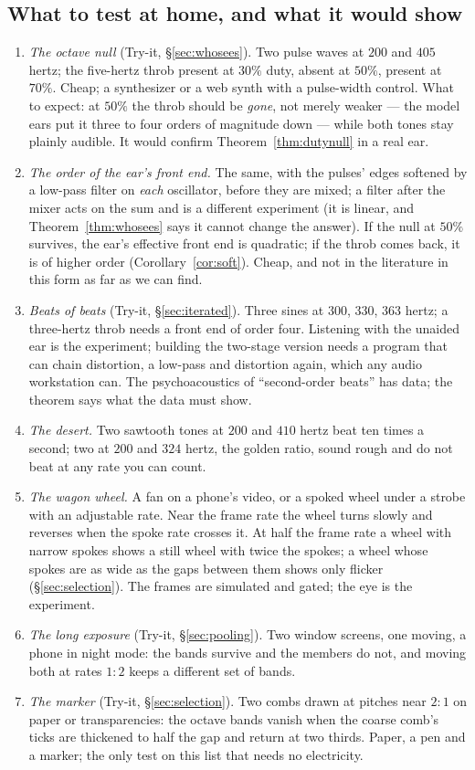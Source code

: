 \subsection{What to test at home, and what it would show}
\begin{enumerate}
\item \emph{The octave null} (Try-it, \S\ref{sec:whosees}). Two pulse
waves at $200$ and $405$ hertz; the five-hertz throb present at $30\%$
duty, absent at $50\%$, present at $70\%$. Cheap; a synthesizer or a web
synth with a pulse-width control. What to expect: at $50\%$ the throb
should be \emph{gone}, not merely weaker --- the model ears put it three to
four orders of magnitude down --- while both tones stay plainly audible.
It would confirm Theorem~\ref{thm:dutynull} in a real ear.
\item \emph{The order of the ear's front end.} The same, with the pulses'
edges softened by a low-pass filter on \emph{each} oscillator, before they
are mixed; a filter after the mixer acts on the sum and is a different
experiment (it is linear, and Theorem~\ref{thm:whosees} says it cannot
change the answer). If the null at $50\%$ survives, the ear's effective
front end is quadratic; if the throb comes back, it is of higher order
(Corollary~\ref{cor:soft}). Cheap, and not in the literature in this form
as far as we can find.
\item \emph{Beats of beats} (Try-it, \S\ref{sec:iterated}). Three sines at
$300$, $330$, $363$ hertz; a three-hertz throb needs a front end of order
four. Listening with the unaided ear is the experiment; building the
two-stage version needs a program that can chain distortion, a low-pass and
distortion again, which any audio workstation can. The psychoacoustics of
``second-order beats'' has data; the theorem says what the data must show.
\item \emph{The desert.} Two sawtooth tones at $200$ and $410$ hertz beat
ten times a second; two at $200$ and $324$ hertz, the golden ratio, sound
rough and do not beat at any rate you can count.
\item \emph{The wagon wheel.} A fan on a phone's video, or a spoked wheel
under a strobe with an adjustable rate. Near the frame rate the wheel turns
slowly and reverses when the spoke rate crosses it. At half the frame rate
a wheel with narrow spokes shows a still wheel with twice the spokes; a
wheel whose spokes are as wide as the gaps between them shows only
flicker (\S\ref{sec:selection}). The frames are simulated and gated; the
eye is the experiment.
\item \emph{The long exposure} (Try-it, \S\ref{sec:pooling}). Two window
screens, one moving, a phone in night mode: the bands survive and the
members do not, and moving both at rates $1{:}2$ keeps a different set of
bands.
\item \emph{The marker} (Try-it, \S\ref{sec:selection}). Two combs drawn
at pitches near $2{:}1$ on paper or transparencies: the octave bands vanish
when the coarse comb's ticks are thickened to half the gap and return at
two thirds. Paper, a pen and a marker; the only test on this list that
needs no electricity.
\end{enumerate}
